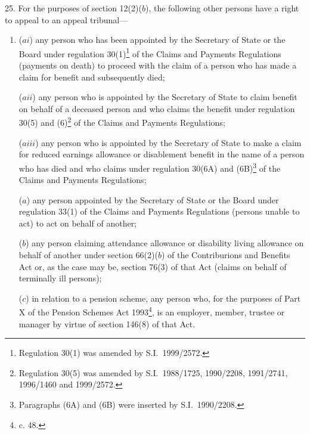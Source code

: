 \documentclass[12pt,a4paper]{article}
\begin{document}
25.  For the purposes of section 12(2)($b$), the following other persons have a right to appeal to an appeal tribunal—
\begin{enumerate}\item[]
($ai$) any person who has been appointed by the Secretary of State or the Board under regulation 30(1)\footnote{Regulation 30(1) was amended by S.I.\ 1999/2572.} of the Claims and Payments Regulations (payments on death) to proceed with the claim of a person who has made a claim for benefit and subsequently died;

($aii$) any person who is appointed by the Secretary of State to claim benefit on behalf of a deceased person and who claims the benefit under regulation 30(5) and (6)\footnote{Regulation 30(5) was amended by S.I.\ 1988/1725, 1990/2208, 1991/2741, 1996/1460 and 1999/2572.} of the Claims and Payments Regulations;

($aiii$) any person who is appointed by the Secretary of State to make a claim for reduced earnings allowance or disablement benefit in the name of a person who has died and who claims under regulation 30(6A) and (6B)\footnote{Paragraphs (6A) and (6B) were inserted by S.I.\ 1990/2208.} of the Claims and Payments Regulations;

($a$) any person appointed by the Secretary of State 
or the Board  %
under regulation 33(1) of the Claims and Payments Regulations (persons unable to act) to act on behalf of another;

($b$) any person claiming attendance allowance or disability living allowance on behalf of another under section 66(2)($b$) of the Contriburions and Benefits Act or, as the case may be, section 76(3) of that Act (claims on behalf of terminally ill persons);

($c$) in relation to a pension scheme, any person who, for the purposes of Part X of the Pension Schemes Act 1993\footnote{ c. 48.}, is an employer, member, trustee or manager by virtue of section 146(8) of that Act.
\end{enumerate}


\end{document}
